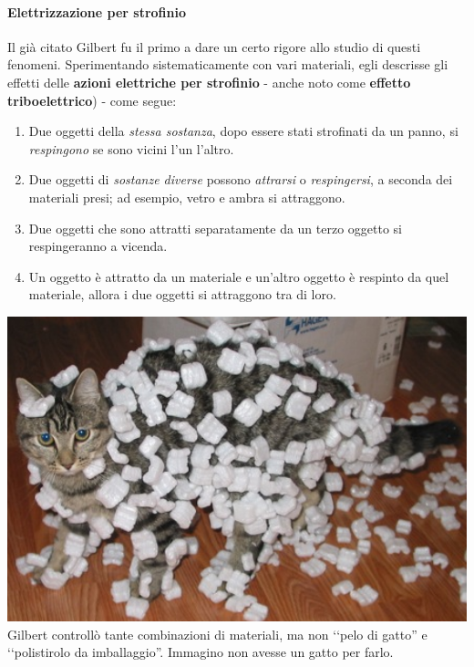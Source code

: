 \paragraph{Elettrizzazione per strofinio}
Il già citato Gilbert fu il primo a dare un certo rigore allo studio di questi fenomeni. Sperimentando sistematicamente con vari materiali, egli descrisse gli effetti delle \textbf{azioni elettriche per strofinio} - anche noto come \textbf{effetto triboelettrico}) - come segue:\\
\begin{minipage}{0.65\textwidth}
\begin{enumerate}[label=\alph*)]
	\item Due oggetti della \textit{stessa sostanza}, dopo essere stati strofinati da un panno, si \textit{respingono} se sono vicini l'un l'altro.
	\item Due oggetti di \textit{sostanze diverse} possono \textit{attrarsi} o \textit{respingersi}, a seconda dei materiali presi; ad esempio, vetro e ambra si attraggono.
	\item Due oggetti che sono attratti separatamente da un terzo oggetto si respingeranno a vicenda.
	\item Un oggetto è attratto da un materiale e un'altro oggetto è respinto da quel materiale, allora i due oggetti si attraggono tra di loro.
\end{enumerate}
\end{minipage}\hspace{10pt}
\begin{minipage}{0.34\textwidth}
		\includegraphics[width=1\textwidth]{images/foamcat.jpg}
	{\footnotesize Gilbert controllò tante combinazioni di materiali, ma non ‘‘pelo di gatto'' e ‘‘polistirolo da imballaggio''. Immagino non avesse un gatto per farlo.}
\end{minipage}\vspace{3pt}\\
